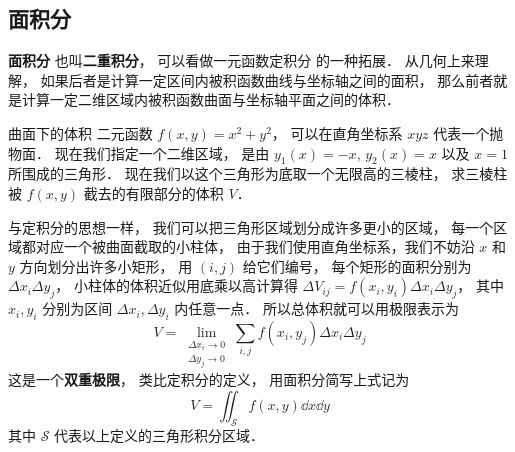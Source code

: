 
\subsection{面积分}
\textbf{面积分} 也叫\textbf{二重积分}， 可以看做一元函数定积分 的一种拓展． 从几何上来理解， 如果后者是计算一定区间内被积函数曲线与坐标轴之间的面积， 那么前者就是计算一定二维区域内被积函数曲面与坐标轴平面之间的体积．

\begin{exam}{曲面下的体积}
二元函数 $f(x,y) = x^2 + y^2$， 可以在直角坐标系 $xyz$ 代表一个抛物面． 现在我们指定一个二维区域， 是由 $y_1(x) = -x$, $y_2(x) = x$ 以及 $x = 1$ 所围成的三角形． 现在我们以这个三角形为底取一个无限高的三棱柱， 求三棱柱被 $f(x,y)$ 截去的有限部分的体积 $V$．

与定积分的思想一样， 我们可以把三角形区域划分成许多更小的区域， 每一个区域都对应一个被曲面截取的小柱体， 由于我们使用直角坐标系，我们不妨沿 $x$ 和 $y$ 方向划分出许多小矩形， 用 $(i,j)$ 给它们编号， 每个矩形的面积分别为 $\Delta x_i \Delta y_j$， 小柱体的体积近似用底乘以高计算得 $\Delta V_{ij} = f(x_i,y_i) \Delta x_i \Delta y_j$， 其中 $x_i, y_i$ 分别为区间 $\Delta x_i, \Delta y_i$ 内任意一点． 所以总体积就可以用极限表示为
\begin{equation}\label{IntN_eq1}
V = \lim_{\substack{\Delta x_i\to 0\\ \Delta y_j\to 0}} \sum_{i, j} f(x_i,y_j) \Delta x_i \Delta y_j
\end{equation}
这是一个\textbf{双重极限}， 类比定积分的定义， 用面积分简写上式记为
\begin{equation}
V = \iint_{\mathcal{S}} f(x,y) \dd{x}\dd{y}
\end{equation}
其中 $\mathcal{S}$ 代表以上定义的三角形积分区域． 


\end{exam}
